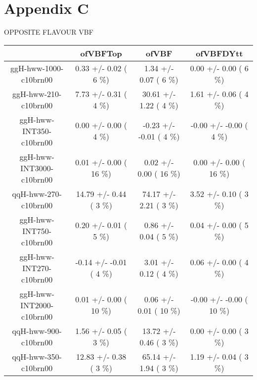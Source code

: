 \section{Appendix C}\label{sec:AppC}



\begin{table}[h!]\begin{center}
OPPOSITE FLAVOUR VBF\\

\footnotesize{\begin{tabular}{
c| c | c | c | } \hline
  &      ofVBFTop  &         ofVBF  &     ofVBFDYtt  \\ \hline
 ggH-hww-1000-c10brn00   &       0.33 +/-       0.02 (         6 \%)   &       1.34 +/-       0.07 (         6 \%)   &       0.00 +/-       0.00 (         6 \%)  \\
 ggH-hww-210-c10brn00   &       7.73 +/-       0.31 (         4 \%)   &      30.61 +/-       1.22 (         4 \%)   &       1.61 +/-       0.06 (         4 \%)  \\
 ggH-hww-INT350-c10brn00   &       0.00 +/-       0.00 (         4 \%)   &      -0.23 +/-      -0.01 (         4 \%)   &      -0.00 +/-      -0.00 (         4 \%)  \\
 ggH-hww-INT3000-c10brn00   &       0.01 +/-       0.00 (        16 \%)   &       0.02 +/-       0.00 (        16 \%)   &       0.00 +/-       0.00 (        16 \%)  \\
 qqH-hww-270-c10brn00   &      14.79 +/-       0.44 (         3 \%)   &      74.17 +/-       2.21 (         3 \%)   &       3.52 +/-       0.10 (         3 \%)  \\
 ggH-hww-INT750-c10brn00   &       0.20 +/-       0.01 (         5 \%)   &       0.86 +/-       0.04 (         5 \%)   &       0.04 +/-       0.00 (         5 \%)  \\
 ggH-hww-INT270-c10brn00   &      -0.14 +/-      -0.01 (         4 \%)   &       3.01 +/-       0.12 (         4 \%)   &       0.06 +/-       0.00 (         4 \%)  \\
 ggH-hww-INT2000-c10brn00   &       0.01 +/-       0.00 (        10 \%)   &       0.06 +/-       0.01 (        10 \%)   &      -0.00 +/-      -0.00 (        10 \%)  \\
 qqH-hww-900-c10brn00   &       1.56 +/-       0.05 (         3 \%)   &      13.72 +/-       0.46 (         3 \%)   &       0.00 +/-       0.00 (         3 \%)  \\
 qqH-hww-350-c10brn00   &      12.83 +/-       0.38 (         3 \%)   &      65.14 +/-       1.94 (         3 \%)   &       1.19 +/-       0.04 (         3 \%)  \\

\end{tabular}}
\end{center}
\end{table}
